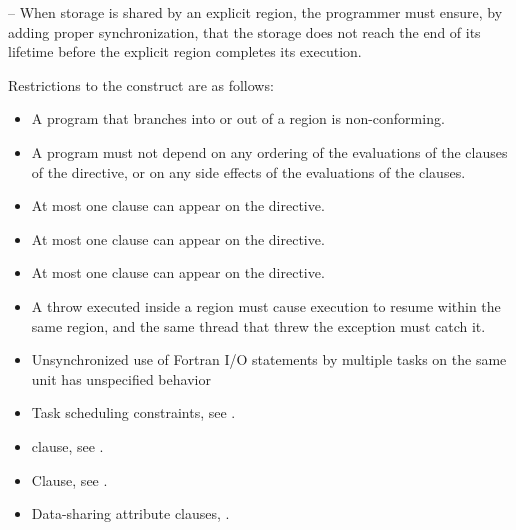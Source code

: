 \notestart
\noteheader – When storage is shared by an explicit  region, the 
programmer must ensure, by adding proper synchronization, that the storage does not 
reach the end of its lifetime before the explicit  region completes its execution.
\noteend

\restrictions
Restrictions to the  construct are as follows:

\begin{itemize}
\item A program that branches into or out of a  region is non-conforming. 

\item A program must not depend on any ordering of the evaluations of the clauses of the 
 directive, or on any side effects of the evaluations of the clauses. 

\item At most one  clause can appear on the directive. 

\item At most one  clause can appear on the directive.

\item At most one  clause can appear on the directive.

\ccppspecificstart
\item A throw executed inside a  region must cause execution to resume within the 
same  region, and the same thread that threw the exception must catch it.
\ccppspecificend

\fortranspecificstart
\item Unsynchronized use of Fortran I/O statements by multiple tasks on the same unit has 
unspecified behavior
\fortranspecificend
\end{itemize}

\crossreferences
\begin{itemize}
\item Task scheduling constraints, see . 
\item {} clause, see .
\item {} Clause, see .
\item Data-sharing attribute clauses, .
\end{itemize}











